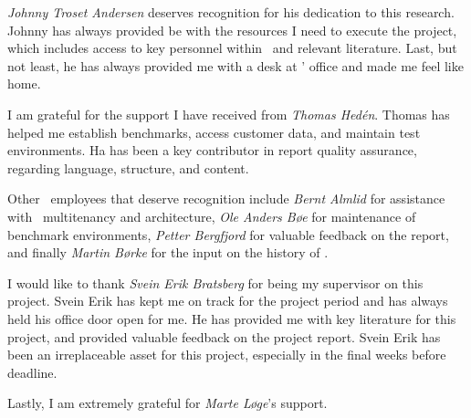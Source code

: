 \textit{Johnny Troset Andersen} deserves recognition for his dedication to this research. Johnny has always provided be with the resources I need to execute the project, which includes access to key personnel within \genus~and relevant literature. Last, but not least, he has always provided me with a desk at \genus' office and made me feel like home.

I am grateful for the support I have received from \textit{Thomas Hedén}. Thomas has helped me establish benchmarks, access customer data, and maintain test environments. Ha has been a key contributor in report quality assurance, regarding language, structure, and content.

Other \genus~employees that deserve recognition include \textit{Bernt Almlid} for assistance with \gap~multitenancy and architecture, \textit{Ole Anders Bøe} for maintenance of benchmark environments, \textit{Petter Bergfjord} for valuable feedback on the report, and finally \textit{Martin Børke} for the input on the history of \bi. 

I would like to thank \textit{Svein Erik Bratsberg} for being my supervisor on this project. Svein Erik has kept me on track for the project period and has always held his office door open for me. He has provided me with key literature for this project, and provided valuable feedback on the project report. Svein Erik has been an irreplaceable asset for this project, especially in the final weeks before deadline.

Lastly, I am extremely grateful for \textit{Marte Løge}'s support.
